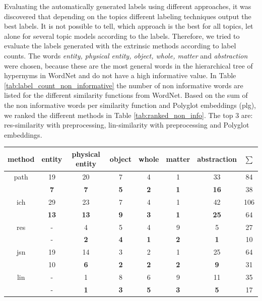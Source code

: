 {\begin{table}
	\label{tab:labeled_extrinsic_and_manually}
\end{table}
Evaluating the automatically generated labels using different approaches, it was discovered that depending on the topics different labeling techniques output the best labels. It is not possible to tell, which approach is the best for all topics, let alone for several topic models according to the labels. Therefore, we tried to evaluate the labels generated with the extrinsic methods according to label counts. The words \textit{entity, physical entity, object, whole, matter} and \textit{abstraction} were chosen, because these are the most general words in the hierarchical tree of hypernyms in WordNet and do not have a high informative value. 
In Table \ref{tab:label_count_non_informative} the number of non informative words are listed for the different similarity functions from WordNet. Based on the sum of the non informative words per similarity function and Polyglot embeddings (plg), we ranked the different methods in Table \ref{tab:ranked_non_info}. The top 3 are: res-similarity with preprocessing, lin-similarity with preprocessing and Polyglot embeddings.
\begin{table}[h]
	\begin{tabular}{c|c|c|c|c|c|c|c}
		method & entity	& physical entity & object & whole & matter & abstraction & $\sum$ \\
		\hline
		path& 19		&20				  &7	   &4      &1       &33 &84\\
		& \textbf{7}&\textbf{7}	 &\textbf{5}  &\textbf{2} &\textbf{1} &\textbf{16} & 38\\
		\hline
		ich& 29		&23				  &7	   &4      &1       &42 & 106\\
		& \textbf{13}&\textbf{13}	 &\textbf{9}  &\textbf{3} &\textbf{1} &\textbf{25} & 64\\
		\hline
		res& -		&4				  &5	   &4      &9       &5 &27\\
		& -			&\textbf{2}	 &\textbf{4}  &\textbf{1} &\textbf{2} &\textbf{1} &10\\
		\hline
		jsn& 19		&14				  &3	   &2      &1       &25 &64\\
		&10 		&\textbf{6}	 &\textbf{2}  &\textbf{2} &\textbf{2} &\textbf{9} &31\\
		\hline
		lin& -		&1				  &8	   &6      &9       &11 &35\\
		& -	 	&\textbf{1}	 &\textbf{3}  &\textbf{5} &\textbf{3} &\textbf{5} &17\\

\end{tabular}
\end{table}}
